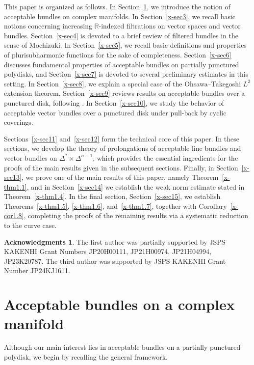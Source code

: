 \documentclass[12pt,twoside]{amsart}
\theoremstyle{definition}
\newtheorem*{ack}{Acknowledgments}
\begin{document}
This paper is organized as follows.
In Section~\ref{x-sec2}, we introduce the notion of acceptable bundles on
complex manifolds. 
In Section~\ref{x-sec3}, we 
recall basic notions concerning increasing 
$\mathbb R$-indexed filtrations on vector spaces and vector bundles. 
Section~\ref{x-sec4} is devoted to a brief review of filtered bundles in
the sense of Mochizuki.
In Section~\ref{x-sec5}, we recall basic definitions and properties of
plurisubharmonic functions for the sake of completeness.
Section~\ref{x-sec6} discusses fundamental properties of acceptable
bundles on partially punctured polydisks, and Section~\ref{x-sec7} is
devoted to several preliminary estimates in this setting.
In Section~\ref{x-sec8}, we explain a special case of the
Ohsawa--Takegoshi $L^2$ extension theorem.
Section~\ref{x-sec9} reviews results on acceptable bundles over a
punctured disk, following \cite{fujino-fujisawa-ono}.
In Section~\ref{x-sec10}, we study the behavior of acceptable vector
bundles over a punctured disk under pull-back by cyclic coverings.

Sections~\ref{x-sec11} and~\ref{x-sec12} form the technical core of this
paper.
In these sections, we develop the theory of prolongations of acceptable
line bundles and vector bundles on
$\Delta^*\times \Delta^{n-1}$, which provides the essential ingredients
for the proofs of the main results given in the subsequent sections.
Finally, in Section~\ref{x-sec13}, we prove one of the main results of
this paper, namely Theorem~\ref{x-thm1.1}, and in
Section~\ref{x-sec14} we establish the weak norm estimate stated in
Theorem~\ref{x-thm1.4}.
In the final section, Section~\ref{x-sec15}, 
we establish
Theorems~\ref{x-thm1.5}, \ref{x-thm1.6}, and~\ref{x-thm1.7}, together with
Corollary~\ref{x-cor1.8}, completing the proofs of the remaining results
via a systematic reduction to the curve case.

\begin{ack}\label{x-ack}
The first author was partially 
supported by JSPS KAKENHI Grant Numbers 
JP20H00111, JP21H00974, JP21H04994, JP23K20787. 
The third author was supported by 
JSPS KAKENHI Grant Number JP24KJ1611. 
\end{ack}

\section{Acceptable bundles on a complex manifold}\label{x-sec2}

Although our main interest lies in acceptable bundles on a partially  
punctured polydisk, we begin by recalling the general framework.
\end{document}

